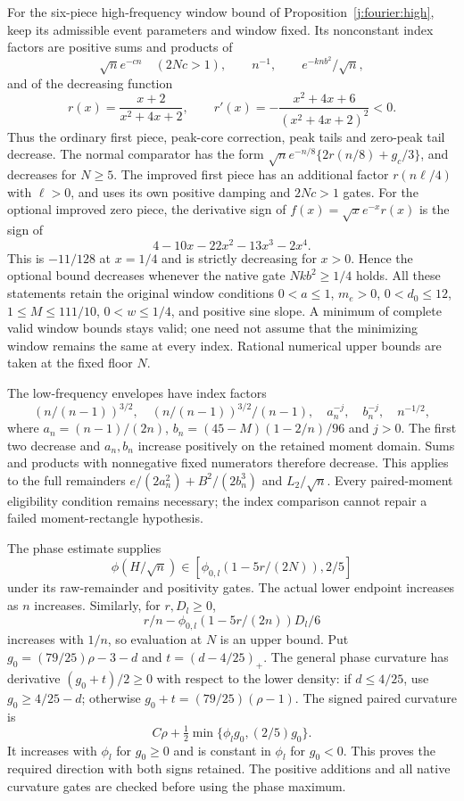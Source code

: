 For the six-piece high-frequency window bound of Proposition~\ref{j:fourier:high}, keep its admissible
event parameters and window fixed. Its nonconstant index factors are
positive sums and products of
\[
 \sqrt n e^{-cn}\quad(2Nc>1),\qquad n^{-1},\qquad
 e^{-knb^2}/\sqrt n,
\]
and of the decreasing function
\[
 r(x)=\frac{x+2}{x^2+4x+2},\qquad
 r'(x)=-\frac{x^2+4x+6}{(x^2+4x+2)^2}<0.
\]
Thus the ordinary first piece, peak-core correction, peak tails and
zero-peak tail decrease. The normal comparator has the form
$\sqrt n e^{-n/8}\{2r(n/8)+g_c/3\}$, and decreases for $N\ge5$.
The improved first piece has an additional factor $r(n\ell/4)$
with $\ell>0$, and uses its own positive damping and $2Nc>1$ gates.
For the optional improved zero piece, the derivative sign of
$f(x)=\sqrt{x}e^{-x}r(x)$ is the sign of
\[
 4-10x-22x^2-13x^3-2x^4.
\]
This is $-11/128$ at $x=1/4$ and is strictly decreasing for $x>0$.
Hence the optional bound decreases whenever the native gate
$Nkb^2\ge1/4$ holds. All these statements retain the original
window conditions $0<a\le1$, $m_e>0$, $0<d_0\le12$,
$1\le M\le111/10$, $0<w\le1/4$, and positive sine slope.
A minimum of complete valid window bounds stays valid; one need not
assume that the minimizing window remains the same at every index.
Rational numerical upper bounds are taken at the fixed floor $N$.

The low-frequency envelopes have index factors
\[
 (n/(n-1))^{3/2},\quad (n/(n-1))^{3/2}/(n-1),\quad
 a_n^{-j},\quad b_n^{-j},\quad n^{-1/2},
\]
where $a_n=(n-1)/(2n)$, $b_n=(45-M)(1-2/n)/96$ and $j>0$.
The first two decrease and $a_n,b_n$ increase positively on the
retained moment domain. Sums and products with nonnegative fixed
numerators therefore decrease. This applies to the full remainders
$e/(2a_n^2)+B^2/(2b_n^3)$ and $L_2/\sqrt n$.
Every paired-moment eligibility condition remains necessary; the
index comparison cannot repair a failed moment-rectangle hypothesis.

The phase estimate supplies
\[
 \phi(H/\sqrt n)\in[\phi_{0,l}(1-5r/(2N)),2/5]
\]
under its raw-remainder and positivity gates. The actual lower
endpoint increases as $n$ increases. Similarly, for $r,D_l\ge0$,
\[
 r/n-\phi_{0,l}(1-5r/(2n))D_l/6
\]
increases with $1/n$, so evaluation at $N$ is an upper bound.
Put $g_0=(79/25)\rho-3-d$ and $t=(d-4/25)_+$.
The general phase curvature has derivative $(g_0+t)/2\ge0$
with respect to the lower density: if $d\le4/25$, use
$g_0\ge4/25-d$; otherwise $g_0+t=(79/25)(\rho-1)$.
The signed paired curvature is
\[
 C\rho+\tfrac12\min\{\phi_lg_0,(2/5)g_0\}.
\]
It increases with $\phi_l$ for $g_0\ge0$ and is constant in
$\phi_l$ for $g_0<0$. This proves the required direction with
both signs retained. The positive additions and all native
curvature gates are checked before using the phase maximum.

